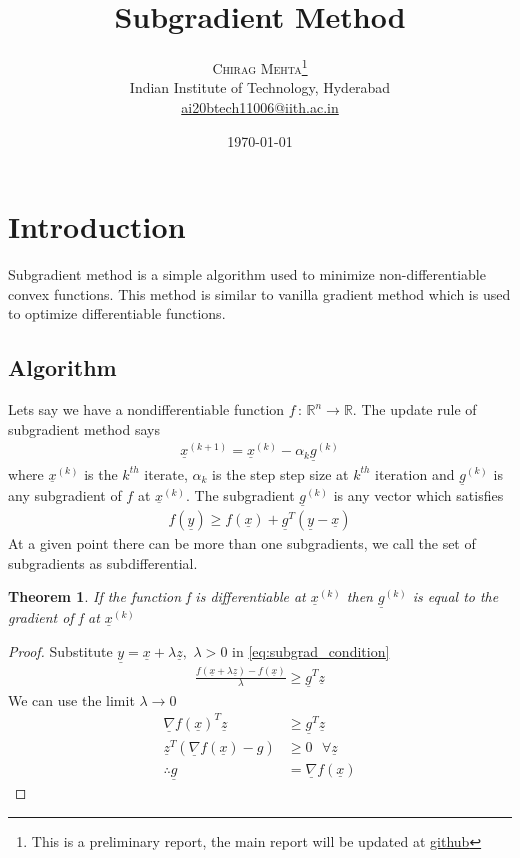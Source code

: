 \documentclass[twoside,twocolumn]{article}
\title{Subgradient Method} %
\author{%
\textsc{Chirag Mehta}\thanks{This is a preliminary report, the main report will be updated at \href{https://github.com/cmaspi/subgradient_method/blob/master/latex/main.pdf}{github}} \\[1ex] %
\normalsize Indian Institute of Technology, Hyderabad \\ %
\normalsize \href{mailto:ai20btech11006@iith.ac.in}{ai20btech11006@iith.ac.in} %
}
\date{\today} %
\newtheorem{theorem}{Theorem}[section]
\renewcommand{\vec}[1]{\underline{#1}}
\newcommand\twospace{\,\,}
\newcommand\fourspace{\,\,\,\,}
\begin{document}
\maketitle

\section{Introduction}
Subgradient method is a simple algorithm used to minimize non-differentiable convex functions. This method is similar to vanilla gradient method which is used to optimize differentiable functions. 

\subsection{Algorithm}
Lets say we have a nondifferentiable function $f\, : \, \mathbb{R}^n\to \mathbb{R}$. The update rule of subgradient method says
\begin{align}
    \vec{x}^{(k+1)} = \vec{x}^{(k)} - \alpha_k\vec{g}^{(k)} \label{eq:subgrad_iter}
\end{align}
where $\vec{x}^{(k)}$ is the $k^{th}$ iterate, $\alpha_k$ is the step step size at $k^{th}$ iteration and $\vec{g}^{(k)}$ is any subgradient of $f$ at $\vec{x}^{(k)}$. The subgradient $\vec{g}^{(k)}$ is any vector which satisfies
\begin{align}
    f(\vec{y}) \geq f(\vec{x}) + \vec{g}^T(\vec{y}-\vec{x})\label{eq:subgrad_condition}
\end{align}
At a given point there can be more than one subgradients, we call the set of subgradients as subdifferential.
\begin{theorem}
    If the function f is differentiable at $\vec{x}^{(k)}$ then $\vec{g}^{(k)}$ is equal to the gradient of f at $\vec{x}^{(k)}$
\end{theorem}
\begin{proof}
    Substitute $\vec{y} = \vec{x}+\lambda\vec{z},\twospace \lambda > 0$ in \eqref{eq:subgrad_condition}
    \begin{align}
        \frac{f(\vec{x}+\lambda\vec{z}) - f(\vec{x})}{\lambda} \geq \vec{g}^T\vec{z}
    \end{align}
    We can use the limit $\lambda \to 0$
    \begin{align}
        \vec{\nabla}f(\vec{x})^T\vec{z} &\geq \vec{g}^T\vec{z}\\
        \vec{z}^T\left(\vec{\nabla}f(\vec{x})-g\right) &\geq 0 \fourspace \forall \vec{z}\\
        \therefore \vec{g} & = \vec{\nabla}f(\vec{x})
    \end{align}
\end{proof}
\end{document}
